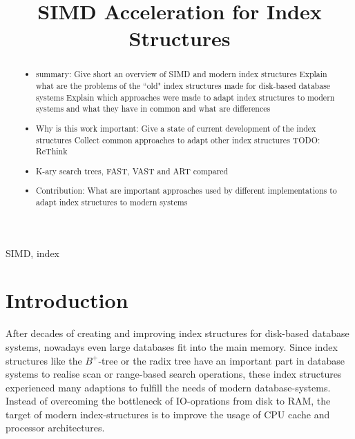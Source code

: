 \documentclass[conference]{IEEEtran}
\begin{document}
\title{SIMD Acceleration for Index Structures\\
}

\author{
}

\maketitle

\begin{abstract}
\begin{itemize}
	\item summary: 
	\subitem Give short an overview of SIMD and modern index structures
	\subitem Explain what are the problems of the ``old" index structures made for disk-based database systems
	\subitem Explain which approaches were made to adapt index structures to modern systems and what they have in common and what are differences
	\item Why is this work important: 
	\subitem Give a state of current development of the index structures
	\subitem Collect common approaches to adapt other index structures TODO: ReThink
	\item K-ary search trees, FAST, VAST and ART compared
	\item Contribution: What are important approaches used by different implementations to adapt index structures to modern systems
\end{itemize}
\end{abstract}

\begin{IEEEkeywords}
SIMD, index 
\end{IEEEkeywords}

\section{Introduction}
After decades of creating and improving index structures for disk-based database systems, nowadays even large databases fit into the main memory. Since index structures like the $B^+$-tree or the radix tree have an important part in database systems to realise scan or range-based search operations, these index structures experienced many adaptions to fulfill the needs of modern database-systems. Instead of overcoming the bottleneck of IO-oprations from disk to RAM, the target of modern index-structures is to improve the usage of CPU cache and processor architectures.
\end{document}
